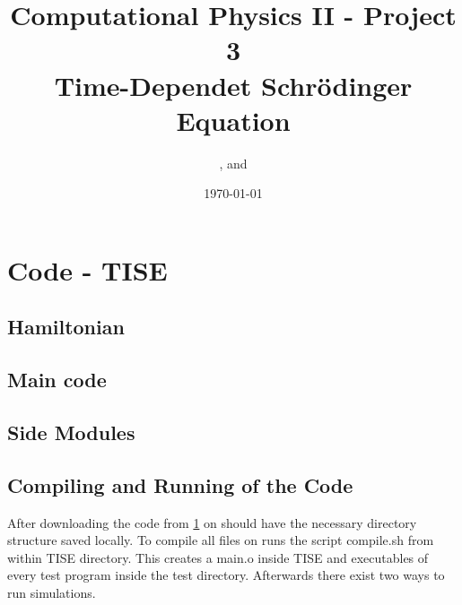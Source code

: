 \documentclass{article}
\title{Computational Physics II - Project 3 \\ Time-Dependet Schrödinger Equation}
\author{\aone\space, \atwo\space and \athree \\ \afour}
\date{\today}
\begin{document}
\maketitle
\tableofcontents
\begin{abstract}
 
\end{abstract}

\section{Code - TISE}\label{code}

\subsection{Hamiltonian}\label{hmltn}

\subsection{Main code}\label{main}

\subsection{Side Modules}

%
\subsection{Compiling and Running of the Code}
After downloading the code from \ref{code} on should have the necessary directory structure saved locally.
To compile all files on runs the script {\selectfont compile.sh} from within TISE directory.
This creates a {\selectfont main.o} inside TISE and executables of every test program inside the test directory.
Afterwards there exist two ways to run simulations. 
\end{document}
